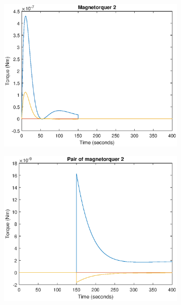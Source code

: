 \begin{figure}[H]
\begin{subfigure}{0.5\linewidth}
	\centering
	\includegraphics[width=1\linewidth]{figures/config2.eps}
	\label{fig:fig:magcompens3}
\end{subfigure}
\begin{subfigure}{0.5\linewidth}
	\centering
	\includegraphics[width=1\linewidth]{figures/config22.eps}
	\label{fig:fig:magcompens4}	
\end{subfigure}
\begin{subfigure}{0.5\linewidth}
	\centering

\end{subfigure}
\end{figure}
